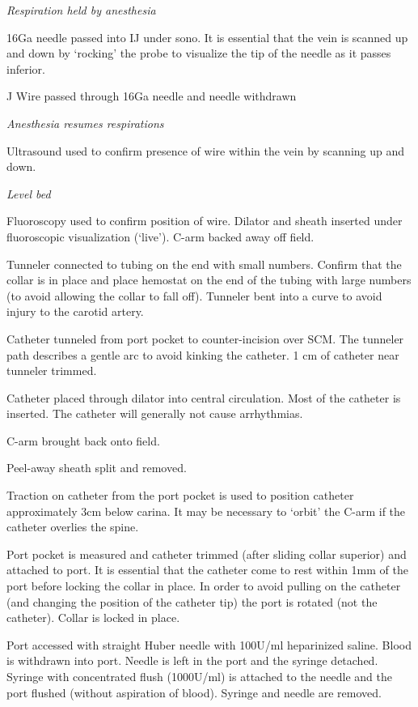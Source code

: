 \documentclass[
]{book}
\begin{document}
\emph{Respiration held by anesthesia}

16Ga needle passed into IJ under sono. It is essential that the vein is scanned up and down by `rocking' the probe to visualize the tip of the needle as it passes inferior.

J Wire passed through 16Ga needle and needle withdrawn

\emph{Anesthesia resumes respirations}

Ultrasound used to confirm presence of wire within the vein by scanning up and down.

\emph{Level bed}

Fluoroscopy used to confirm position of wire. Dilator and sheath inserted under fluoroscopic visualization (`live'). C-arm backed away off field.

Tunneler connected to tubing on the end with small numbers. Confirm that the collar is in place and place hemostat on the end of the tubing with large numbers (to avoid allowing the collar to fall off). Tunneler bent into a curve to avoid injury to the carotid artery.

Catheter tunneled from port pocket to counter-incision over SCM. The tunneler path describes a gentle arc to avoid kinking the catheter. 1 cm of catheter near tunneler trimmed.

Catheter placed through dilator into central circulation. Most of the catheter is inserted. The catheter will generally not cause arrhythmias.

C-arm brought back onto field.

Peel-away sheath split and removed.

Traction on catheter from the port pocket is used to position catheter approximately 3cm below carina. It may be necessary to `orbit' the C-arm if the catheter overlies the spine.

Port pocket is measured and catheter trimmed (after sliding collar superior) and attached to port. It is essential that the catheter come to rest within 1mm of the port before locking the collar in place. In order to avoid pulling on the catheter (and changing the position of the catheter tip) the port is rotated (not the catheter). Collar is locked in place.

Port accessed with straight Huber needle with 100U/ml heparinized saline. Blood is withdrawn into port. Needle is left in the port and the syringe detached. Syringe with concentrated flush (1000U/ml) is attached to the needle and the port flushed (without aspiration of blood). Syringe and needle are removed.
\end{document}
